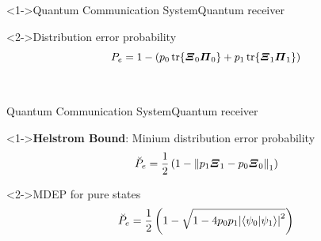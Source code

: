 \begin{frame}<1->{Quantum Communication System}{Quantum receiver}
    \begin{block}<2->{Distribution error probability}
        \begin{equation*}
            P_e=1-\left(p_0 \tr{\Operator{\varXi}_0\Operator{\varPi}_0}+p_1 \tr{\Operator{\varXi}_1\Operator{\varPi}_1}\right)
        \end{equation*}
    \end{block}
    \ \mbox{} \\ \mbox{} 
\end{frame}

\begin{frame}{Quantum Communication System}{Quantum receiver}
    \begin{block}<1->{\textbf{Helstrom Bound}: Minium distribution error probability}
        \begin{equation*}
            \breve{P}_e = \frac{1}{2} \left(1-\norm{p_1 \Operator{\varXi}_1 - p_0 \Operator{\varXi}_0}_1 \right)
        \end{equation*}
    \end{block}
    \begin{block}<2->{MDEP for pure states}
        \begin{equation*}
            \breve{P}_e = \frac{1}{2} \left(1- \sqrt{1-4 p_0 p_1 \absolutevalue{
                \braket{\psi_0}{\psi_1}}^2}\right)
        \end{equation*}
    \end{block}
\end{frame}